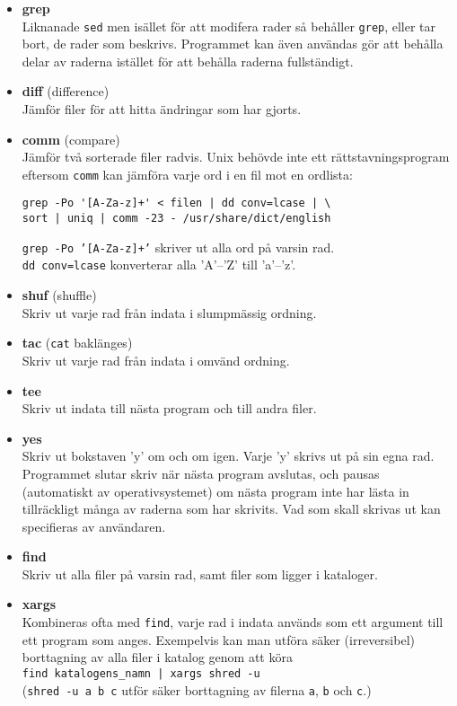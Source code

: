 \documentclass[12pt,a4paper]{article}
\begin{document}
\begin{itemize}
\item \textbf{grep}\\
Liknanade \texttt{sed} men isället för att modifera rader
så behåller \texttt{grep}, eller tar bort, de rader som
beskrivs. Programmet kan även användas gör att behålla
delar av raderna istället för att behålla raderna fullständigt.
\item \textbf{diff} (difference)\\
Jämför filer för att hitta ändringar som har gjorts.
\item \textbf{comm} (compare)\\
Jämför två sorterade filer radvis.
Unix behövde inte ett rätt\-stav\-nings\-pro\-gram eftersom
\texttt{comm} kan jämföra varje ord i en fil mot en
ordlista:
\begin{verbatim}
grep -Po '[A-Za-z]+' < filen | dd conv=lcase | \
sort | uniq | comm -23 - /usr/share/dict/english
\end{verbatim}
\texttt{grep -Po '[A-Za-z]+'} skriver ut alla ord på varsin rad.\\
\texttt{dd conv=lcase} konverterar alla 'A'--'Z' till 'a'--'z'.
\item \textbf{shuf} (shuffle)\\
Skriv ut varje rad från indata i slumpmässig ordning.
\item \textbf{tac} (\texttt{cat} baklänges)\\
Skriv ut varje rad från indata i omvänd ordning.
\item \textbf{tee}\\
Skriv ut indata till nästa program och till andra filer.
\item \textbf{yes}\\
Skriv ut bokstaven 'y' om och om igen. Varje 'y' skrivs
ut på sin egna rad. Programmet slutar skriv när nästa
program avslutas, och pausas (automatiskt av operativsystemet)
om nästa program inte har lästa in tillräckligt många av
raderna som har skrivits. Vad som skall skrivas ut kan
specifieras av användaren.
\item \textbf{find}\\
Skriv ut alla filer på varsin rad, samt filer som
ligger i kataloger.
\item \textbf{xargs}\\
Kombineras ofta med \texttt{find}, varje rad i indata
används som ett argument till ett program som anges.
Exempelvis kan man utföra säker (irreversibel)
borttagning av alla filer i katalog genom att köra\\
\texttt{find katalogens\_namn | xargs shred -u}\\
(\texttt{shred -u a b c} utför säker borttagning
av filerna \texttt{a}, \texttt{b} och \texttt{c}.)
\end{itemize}
\*
\end{document}
